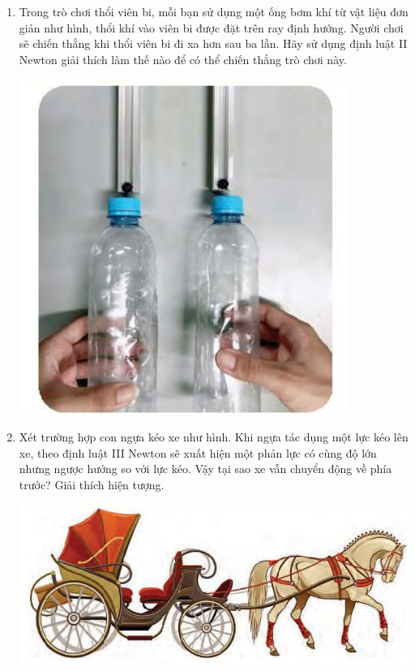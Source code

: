 \begin{enumerate}[label=\bfseries Câu \arabic*:]
		\item {}
		
		{
		Trong trò chơi thổi viên bi, mỗi bạn sử dụng một ống bơm khí từ vật liệu đơn giản như hình, thổi khí vào viên bi được đặt trên ray định hướng. Người chơi sẽ chiến thắng khi thổi viên bi đi xa hơn sau ba lần. Hãy sử dụng định luật II Newton giải thích làm thế nào để có thể chiến thắng trò chơi này.
		\begin{center}
			\includegraphics[scale=0.6]{../figs/VN10-2022-PH-TP017-5.jpg}
		\end{center}
		}
		
			\item {}
		
		{
			Xét trường hợp con ngựa kéo xe như hình. Khi ngựa tác dụng một lực kéo lên xe, theo định luật III Newton sẽ xuất hiện một phản lực có cùng độ lớn nhưng ngược hướng so với lực kéo. Vậy tại sao xe vẫn chuyển động về phía trước? Giải thích hiện tượng.
			\begin{center}
				\includegraphics[scale=0.6]{../figs/VN10-2022-PH-TP017-6.jpg}
			\end{center}
		}
		

\end{enumerate}
